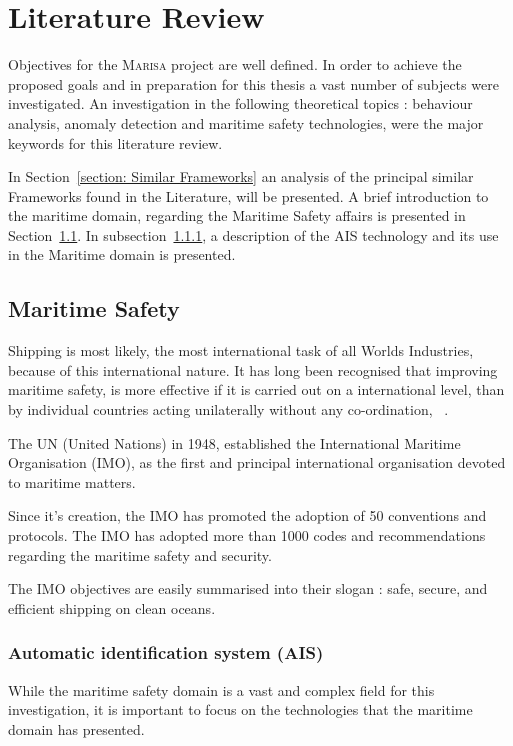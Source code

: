 \chapter{Literature Review}
\label{chapter:literatureReview}

Objectives for the \textsc{Marisa} project are well defined. In order to achieve the proposed goals and in preparation for this thesis a vast number of subjects were investigated. An investigation in the following theoretical topics : behaviour analysis, anomaly detection and maritime safety technologies, were the major keywords for this literature review. 

In Section~\ref{section: Similar Frameworks} an analysis of the principal similar Frameworks found in the Literature, will be presented.
A brief introduction to the maritime domain, regarding the Maritime Safety affairs is presented in Section~\ref{section: Maritime Safety}. In subsection~\ref{subsection: chp2_AIS}, a description of the AIS technology and its use in the Maritime domain is presented.

\section{Maritime Safety}
\label{section: Maritime Safety}

Shipping is most likely, the most international task of all Worlds Industries, because of this international nature. It has long been recognised that improving maritime safety, is more effective if it is  carried out on a international level, than by individual countries acting unilaterally without any co-ordination, ~\cite{IMO2016}.

The UN (United Nations) in 1948, established the International Maritime Organisation (IMO), as the first and principal international organisation devoted to maritime matters. 

Since it's creation, the IMO has promoted the adoption of 50 conventions and protocols. The IMO has adopted more than 1000 codes and recommendations regarding the maritime safety and security.

The IMO objectives are easily summarised into their slogan : safe, secure, and efficient shipping on clean oceans.

\subsection{Automatic identification system (AIS)}
\label{subsection: chp2_AIS}
While the maritime safety domain is a vast and complex field for this investigation, it is important to focus on the technologies that the maritime domain has presented.

